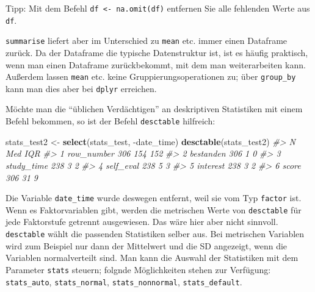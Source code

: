 \documentclass[12pt,ngerman,]{book}
\makeatletter
\newenvironment{Shaded}{\begin{snugshade}}{\end{snugshade}}
\newcommand{\KeywordTok}[1]{\textcolor[rgb]{0.13,0.29,0.53}{\textbf{{#1}}}}
\newcommand{\DataTypeTok}[1]{\textcolor[rgb]{0.13,0.29,0.53}{{#1}}}
\newcommand{\StringTok}[1]{\textcolor[rgb]{0.31,0.60,0.02}{{#1}}}
\newcommand{\CommentTok}[1]{\textcolor[rgb]{0.56,0.35,0.01}{\textit{{#1}}}}
\newcommand{\NormalTok}[1]{{#1}}
\newenvironment{kframe}{%
\medskip{}
\setlength{\fboxsep}{.8em}
 \def\at@end@of@kframe{}%
 \ifinner\ifhmode%
  \def\at@end@of@kframe{\end{minipage}}%
  \begin{minipage}{\columnwidth}%
 \fi\fi%
 \def\FrameCommand##1{\hskip\@totalleftmargin \hskip-\fboxsep
 \colorbox{shadecolor}{##1}\hskip-\fboxsep
     \hskip-\linewidth \hskip-\@totalleftmargin \hskip\columnwidth}%
 \MakeFramed {\advance\hsize-\width
   \@totalleftmargin\z@ \linewidth\hsize
   \@setminipage}}%
 {\par\unskip\endMakeFramed%
 \at@end@of@kframe}
\renewenvironment{Shaded}{\begin{kframe}}{\end{kframe}}
\theoremstyle{definition}
\theoremstyle{definition}
\theoremstyle{remark}
\makeatother
\begin{document}
Tipp: Mit dem Befehl \texttt{df\ \textless{}-\ na.omit(df)} entfernen
Sie alle fehlenden Werte aus \texttt{df}.

\texttt{summarise} liefert aber im Unterschied zu \texttt{mean} etc.
immer einen Dataframe zurück. Da der Dataframe die typische
Datenstruktur ist, ist es häufig praktisch, wenn man einen Dataframe
zurückbekommt, mit dem man weiterarbeiten kann. Außerdem lassen
\texttt{mean} etc. keine Gruppierungsoperationen zu; über
\texttt{group\_by} kann man dies aber bei \texttt{dplyr} erreichen.

Möchte man die ``üblichen Verdächtigen'' an deskriptiven Statistiken mit
einem Befehl bekommen, so ist der Befehl \texttt{desctable} hilfreich:

\begin{Shaded}
\begin{Highlighting}[]
\NormalTok{stats_test2 <-}\StringTok{ }\KeywordTok{select}\NormalTok{(stats_test, -date_time) }
\KeywordTok{desctable}\NormalTok{(stats_test2)}
\CommentTok{#>                N Med IQR}
\CommentTok{#> 1 row_number 306 154 152}
\CommentTok{#> 2  bestanden 306   1   0}
\CommentTok{#> 3 study_time 238   3   2}
\CommentTok{#> 4  self_eval 238   5   3}
\CommentTok{#> 5   interest 238   3   2}
\CommentTok{#> 6      score 306  31   9}
\end{Highlighting}
\end{Shaded}

Die Variable \texttt{date\_time} wurde deswegen entfernt, weil sie vom
Typ \texttt{factor} ist. Wenn es Faktorvariablen gibt, werden die
metrischen Werte von \texttt{desctable} für jede Faktorstufe getrennt
ausgewiesen. Das wäre hier aber nicht sinnvoll. \texttt{desctable} wählt
die passenden Statistiken selber aus. Bei metrischen Variablen wird zum
Beispiel nur dann der Mittelwert und die SD angezeigt, wenn die
Variablen normalverteilt sind. Man kann die Auswahl der Statistiken mit
dem Parameter \texttt{stats} steuern; folgnde Möglichkeiten stehen zur
Verfügung: \texttt{stats\_auto}, \texttt{stats\_normal},
\texttt{stats\_nonnormal}, \texttt{stats\_default}.

\begin{Shaded}
\end{Shaded}
\end{document}
